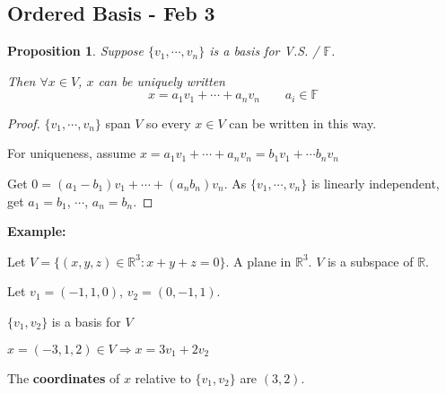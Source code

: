 \documentclass[12pt]{article}
\newtheorem{proposition}{Proposition}[subsection]
\newcommand{\mR}{{\mathbb{R}}}
\newcommand{\mF}{{\mathbb{F}}}
\begin{document}
%
%
%




	\newpage
	\subsection{Ordered Basis - Feb 3}
	\begin{proposition}
		Suppose $\{v_1, \cdots, v_n\}$ is a basis for V.S. / $\mF$. 

		Then $\forall x \in V$, $x$ can be uniquely written 
		\[
			x = a_1v_1 + \cdots + a_nv_n \qquad a_i \in \mF
		\]
	\end{proposition}
	\begin{proof}
		$\{v_1, \cdots, v_n\}$ span $V$ so every $x \in V$ can be written in 
		this way. 

		For uniqueness, assume $x = a_1v_1 + \cdots + a_nv_n = 
		b_1v_1+\cdots b_nv_n$

		Get $0 = (a_1-b_1)v_1+\cdots+(a_nb_n)v_n$. As $\{v_1,\cdots, v_n\}$
		is linearly independent, get $a_1 = b_1$, $\cdots$, $a_n=b_n$. 
	\end{proof}

	{\color{Brown}
	\textbf{Example: }

	Let $V = \{(x,y,z) \in \mR^3 : x + y + z = 0\}$. A plane in $\mR^3$. 
	$V$ is a subspace of $\mR$. 

	Let $v_1 = (-1,1,0)$, $v_2 = (0, -1 ,1)$. 

	$\{v_1, v_2\}$ is a basis for $V$
	
	$x = (-3,1,2) \in V \Rightarrow x = 3v_1 + 2v_2$ 
	
	The \textbf{coordinates} of $x$ relative to $\{v_1, v_2\}$ are $(3,2)$.\\
	}
\end{document}
